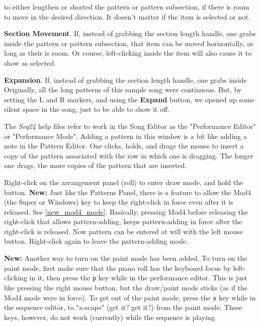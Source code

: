 \begin{enumber}
         to either lengthen or shorted the pattern or pattern subsection, if
         there is room to move in the desired direction.
         It doesn't matter if the item is selected or not.
      \item \textbf{Section Movement}.
         If, instead of grabbing the section length handle, one grabs inside
         the pattern or pattern subsection, that item can be moved
         horizontally, as long as their is room.  Or course, left-clicking
         inside the item will also cause it to show as selected.
      \item \textbf{Expansion}.
         If, instead of grabbing the section length handle, one grabs inside
         Originally, all the long patterns of this sample song were continuous.
         But, by setting the L and R markers, and using the \textbf{Expand}
         button, we opened up some silent space in the song, just to be able
         to show it off.
   \end{enumber}

   The \textsl{Seq24} help files refer to work in the Song Editor as the
   "Performance Editor" or "Performance Mode".  Adding a pattern in this
   window is a bit like adding a note in the Pattern Editor.
   One clicks, holds, and drags the mouse to insert a copy of the pattern
   associated with the row in which one is dragging.  The longer one drags,
   the more copies of the pattern that are inserted.

	Right-click on the arrangement panel (roll) to enter
   draw mode, and hold the button.
   \textbf{New:}
   Just like the Patterns Panel, there is a feature to allow the Mod4 (the
   Super or Windows) key to keep the right-click in force even after it is
   released.  See \ref{new_mod4_mode}.  Basically, pressing Mod4 before
   releasing the right-click that allows pattern-adding, keeps
   pattern-adding in force after the right-click is released.  Now pattern
   can be entered at will with the left mouse button.  Right-click again to
   leave the pattern-adding mode.

   \textbf{New:}
   Another way to turn on the paint mode has been added.
   To turn on the paint mode, first make sure that the piano roll has the
   keyboard focus by left-clicking in it, then press the
   \texttt{p} key while in the performance editor.
   This is just like pressing the right mouse button, but the draw/paint mode
   sticks (as if the Mod4 mode were in force).
   To get out of the paint mode, press the
   \texttt{x} key while in the sequence editor, to "x-scape" (get it?  get it?)
   from the paint mode.
   These keys, however, do not work (currently) while the sequence is playing.

